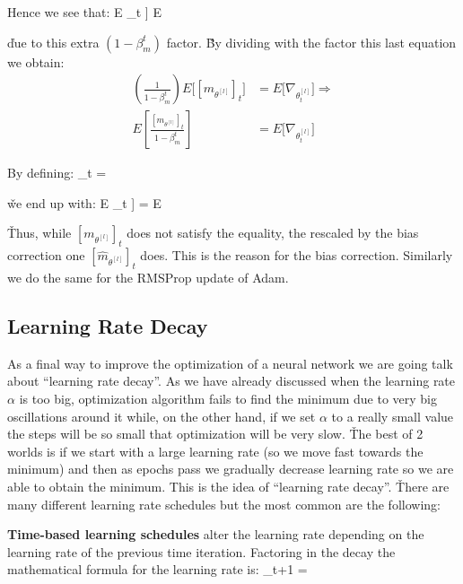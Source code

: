 Hence we see that:
\bse
E \Big[ [m_{\theta^{[l]}}]_t \Big] \neq E
\ese

\v

due to this extra $(1-\beta_m^t)$ factor. \v

By dividing with the factor this last equation we obtain:
{\setlength{\jot}{10pt}
\begin{align*}
\left(\frac{1}{1-\beta_m^t} \right) E \Big[ [m_{\theta^{[l]}}]_t \Big] 
&= E \Big[\nabla_{\theta^{[l]}_t} \Big] \Rightarrow \\
E \left[ \frac{[m_{\theta^{[l]}}]_t}{1-\beta_m^t} \right] &= E \Big[\nabla_{\theta^{[l]}_t} \Big]
\end{align*}}

By defining:
_t = 
\ese

\v

we end up with:
\bse
E \Big[ [{\hat{m}}_{\theta^{[l]}}]_t \Big] = E 
\ese

\v

Thus, while $ [m_{\theta^{[l]}}]_t$ does not satisfy the equality, the rescaled by the bias correction one 
$[{\hat{m}}_{\theta^{[l]}}]_t$ does. This is the reason for the bias correction. Similarly we do the same for the 
RMSProp update of Adam.

\subsection{Learning Rate Decay}

As a final way to improve the optimization of a neural network we are going talk about ``learning rate decay''. As we
have already discussed when the learning rate $\alpha$ is too big, optimization algorithm fails to find the minimum 
due to very big oscillations around it while, on the other hand, if we set $\alpha$ to a really small value the steps
will be so small that optimization will be very slow. \v

The best of 2 worlds is if we start with a large learning rate (so we move fast towards the minimum) and then as 
epochs pass we gradually decrease learning rate so we are able to obtain the minimum. This is the idea of ``learning 
rate decay''. \v

There are many different learning rate schedules but the most common are the following:
\bit
\item \textbf{Time-based learning schedules} alter the learning rate depending on the learning rate of the previous 
time iteration. Factoring in the decay the mathematical formula for the learning rate is:
\bse
\alpha_{t+1} = 
\ese

